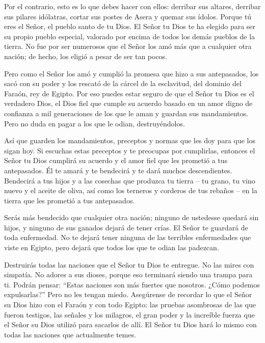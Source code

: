  Por el contrario, esto es lo que debes hacer con ellos:
derribar sus altares, derribar sus pilares idólatras, cortar sus postes
de Asera y quemar sus ídolos.  Porque tú eres el Señor, el
pueblo santo de tu Dios. El Señor tu Dios te ha elegido para ser su
propio pueblo especial, valorado por encima de todos los demás pueblos
de la tierra.  No fue por ser numerosos que el Señor los amó
más que a cualquier otra nación; de hecho, los eligió a pesar de ser tan
pocos.

 Pero como el Señor los amó y cumplió la promesa que hizo a
sus antepasados, los sacó con su poder y los rescató de la cárcel de la
esclavitud, del dominio del Faraón, rey de Egipto.  Por eso
puedes estar seguro de que el Señor tu Dios es el verdadero Dios, el
Dios fiel que cumple su acuerdo basado en un amor digno de confianza a
mil generaciones de los que le aman y guardan sus mandamientos.
 Pero no duda en pagar a los que le odian, destruyéndolos.

 Así que guarden los mandamientos, preceptos y normas que
les doy para que los sigan hoy.  Si escuchas estas
preceptos y te preocupas por cumplirlas, entonces el Señor tu Dios
cumplirá su acuerdo y el amor fiel que les prometió a tus antepasados.
 Él te amará y te bendecirá y te dará muchos descendientes.
Bendecirá a tus hijos y a las cosechas que produzca tu tierra -- tu
grano, tu vino nuevo y el aceite de oliva, así como los terneros y
corderos de tus rebaños -- en la tierra que les prometió a tus
antepasados.

 Serás más bendecido que cualquier otra nación; ninguno de
ustedesse quedará sin hijos, y ninguno de sus ganados dejará de tener
crías.  El Señor te guardará de toda enfermedad. No te
dejará tener ninguna de las terribles enfermedades que viste en Egipto,
pero dejará que todos los que te odian las padezcan.

 Destruirás todas las naciones que el Señor tu Dios te
entregue. No las mires con simpatía. No adores a sus dioses, porque eso
terminará siendo una trampa para ti.  Podrán pensar:
``Estas naciones son más fuertes que nosotros. ¿Cómo podemos
expulsarlas?''  Pero no les tengan miedo. Asegúrense de
recordar lo que el Señor su Dios hizo con el Faraón y con todo Egipto:
 las pruebas asombrosas de las que fueron testigos, las
señales y los milagros, el gran poder y la increíble fuerza que el Señor
su Dios utilizó para sacarlos de allí. El Señor tu Dios hará lo mismo
con todas las naciones que actualmente temes.

